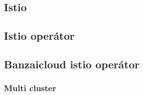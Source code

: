\chapter{\istio}
\section{Istio}
\section{Istio operátor}
\section{Banzaicloud istio operátor}
\subsection{Multi cluster}